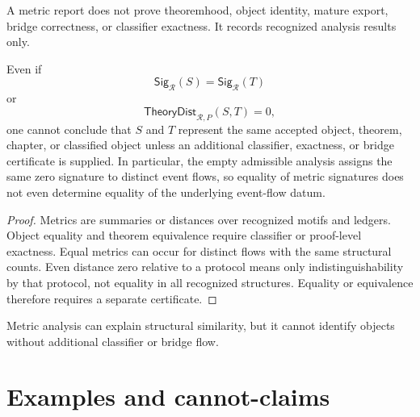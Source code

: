 \begin{principle}
\label{prin:metrics-reports-not-theoremhood}
A metric report does not prove theoremhood, object identity, mature export, bridge correctness, or classifier exactness. It records recognized analysis results only.
\end{principle}

\begin{theorem}
\label{thm:metrics-do-not-imply-object-equality}
Even if
$$
  \mathsf{Sig}_{\mathcal R}(S)=\mathsf{Sig}_{\mathcal R}(T)
$$
or
$$
  \mathsf{TheoryDist}_{\mathcal R,P}(S,T)=0,
$$
one cannot conclude that $S$ and $T$ represent the same accepted object, theorem, chapter, or classified object unless an additional classifier, exactness, or bridge certificate is supplied.
In particular, the empty admissible analysis assigns the same zero signature to distinct event flows, so equality of metric signatures does not even determine equality of the underlying event-flow datum.
\end{theorem}

\begin{proof}
Metrics are summaries or distances over recognized motifs and ledgers. Object equality and theorem equivalence require classifier or proof-level exactness. Equal metrics can occur for distinct flows with the same structural counts. Even distance zero relative to a protocol means only indistinguishability by that protocol, not equality in all recognized structures. Equality or equivalence therefore requires a separate certificate.
\end{proof}

\begin{corollary}
\label{cor:metrics-explanatory-not-identificatory}
Metric analysis can explain structural similarity, but it cannot identify objects without additional classifier or bridge flow.
\end{corollary}

\section{Examples and cannot-claims}
\label{sec:metrics-examples-cannot-claims}

